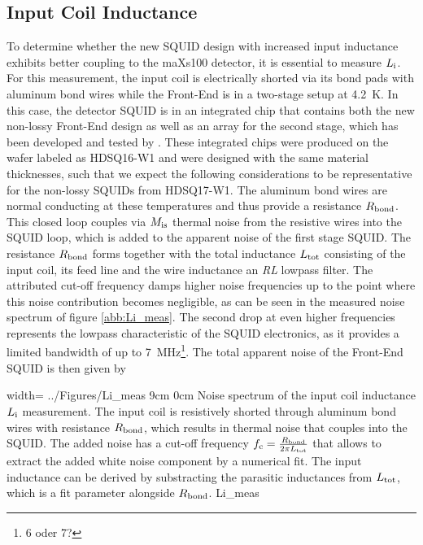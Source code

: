 

\subsection{Input Coil Inductance} \label{subsec_Li}

To determine whether the new SQUID design with increased input inductance exhibits better coupling to the maXs100 detector, it is essential to measure $L_{\rm i}$. For this measurement, the input coil is electrically shorted via its bond pads with aluminum bond wires while the Front-End is in a two-stage setup at \qty{4.2}{\kelvin}. In this case, the detector SQUID is in an integrated chip that contains both the new non-lossy Front-End design as well as an array for the second stage, which has been developed and tested by \cite{Kraemer2023}. These integrated chips were produced on the wafer labeled as HDSQ16-W1 and were designed with the same material thicknesses, such that we expect the following considerations to be representative for the non-lossy SQUIDs from HDSQ17-W1. The aluminum bond wires are normal conducting at these temperatures and thus provide a resistance $R_{\rm bond}$. This closed loop couples via $M_{\rm is}$ thermal noise from the resistive wires into the SQUID loop, which is added to the apparent noise of the first stage SQUID. The resistance $R_{\rm bond}$ forms together with the total inductance $L_{\rm tot}$ consisting of the input coil, its feed line and the wire inductance an \textit{RL} lowpass filter. The attributed cut-off frequency damps higher noise frequencies up to the point where this noise contribution becomes negligible, as can be seen in the measured noise spectrum of figure \ref{abb:Li_meas}. The second drop at even higher frequencies represents the lowpass characteristic of the SQUID electronics, as it provides a limited bandwidth of up to \qty{7}{\mega\hertz}\footnote{6 oder 7?}. The total apparent noise of the Front-End SQUID is then given by     

{width=\textwidth} %
{../Figures/Li_meas}
{9cm} %
{0cm}
{Noise spectrum of the input coil inductance $L_{\rm i}$ measurement. The input coil is resistively shorted through aluminum bond wires with resistance $R_{\rm bond}$, which results in thermal noise that couples into the SQUID. The added noise has a cut-off frequency $f_{\rm c}=\frac{R_{\rm bond}}{2\pi L_{\rm tot}}$ that allows to extract the added white noise component by a numerical fit. The input inductance can be derived by substracting the parasitic inductances from $L_{\rm tot}$, which is a fit parameter alongside $R_{\rm bond}$.}
{Li_meas}


